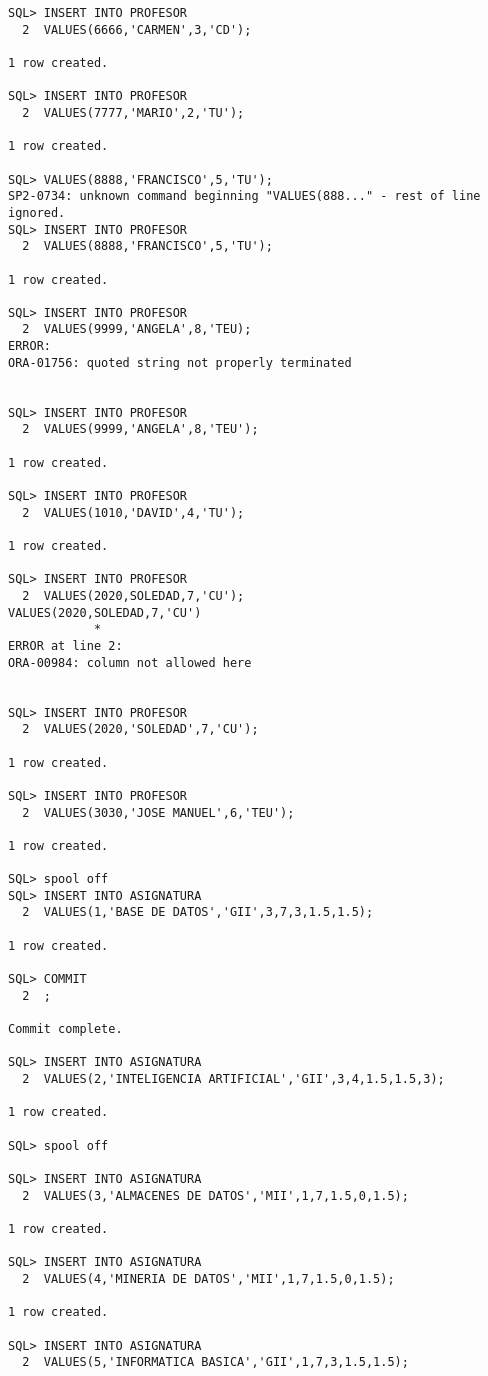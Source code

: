 \documentclass[11pt]{report}
\begin{document}
\begin{verbatim}
SQL> INSERT INTO PROFESOR
  2  VALUES(6666,'CARMEN',3,'CD');

1 row created.

SQL> INSERT INTO PROFESOR
  2  VALUES(7777,'MARIO',2,'TU');

1 row created.

SQL> VALUES(8888,'FRANCISCO',5,'TU');
SP2-0734: unknown command beginning "VALUES(888..." - rest of line ignored.
SQL> INSERT INTO PROFESOR
  2  VALUES(8888,'FRANCISCO',5,'TU');

1 row created.

SQL> INSERT INTO PROFESOR
  2  VALUES(9999,'ANGELA',8,'TEU);
ERROR:
ORA-01756: quoted string not properly terminated 


SQL> INSERT INTO PROFESOR
  2  VALUES(9999,'ANGELA',8,'TEU');

1 row created.

SQL> INSERT INTO PROFESOR
  2  VALUES(1010,'DAVID',4,'TU');

1 row created.

SQL> INSERT INTO PROFESOR
  2  VALUES(2020,SOLEDAD,7,'CU');
VALUES(2020,SOLEDAD,7,'CU')
            *
ERROR at line 2:
ORA-00984: column not allowed here 


SQL> INSERT INTO PROFESOR
  2  VALUES(2020,'SOLEDAD',7,'CU');

1 row created.

SQL> INSERT INTO PROFESOR
  2  VALUES(3030,'JOSE MANUEL',6,'TEU');

1 row created.

SQL> spool off
SQL> INSERT INTO ASIGNATURA
  2  VALUES(1,'BASE DE DATOS','GII',3,7,3,1.5,1.5);

1 row created.

SQL> COMMIT
  2  ;

Commit complete.

SQL> INSERT INTO ASIGNATURA
  2  VALUES(2,'INTELIGENCIA ARTIFICIAL','GII',3,4,1.5,1.5,3);

1 row created.

SQL> spool off

SQL> INSERT INTO ASIGNATURA
  2  VALUES(3,'ALMACENES DE DATOS','MII',1,7,1.5,0,1.5);

1 row created.

SQL> INSERT INTO ASIGNATURA
  2  VALUES(4,'MINERIA DE DATOS','MII',1,7,1.5,0,1.5);

1 row created.

SQL> INSERT INTO ASIGNATURA
  2  VALUES(5,'INFORMATICA BASICA','GII',1,7,3,1.5,1.5);


\end{verbatim}
\end{document}
